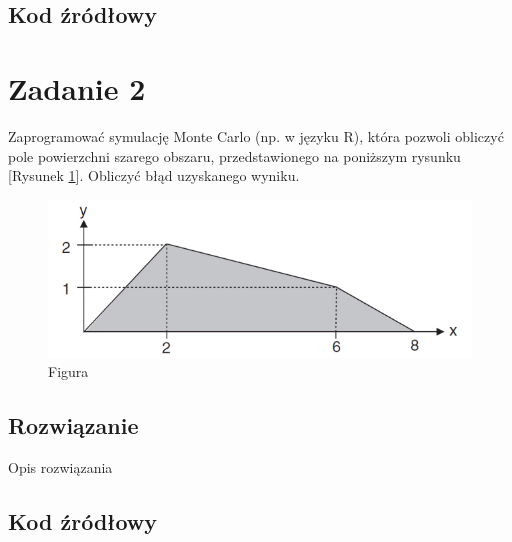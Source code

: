 \documentclass[a4paper,11pt,titlepage]{article}
\begin{document}
\subsection{Kod źródłowy}




\section{Zadanie 2}
Zaprogramować symulację Monte Carlo (np. w języku R), która pozwoli obliczyć pole powierzchni szarego obszaru, przedstawionego na poniższym rysunku [Rysunek \ref{fig:wykres2}]. Obliczyć błąd uzyskanego wyniku.

\begin{figure}[H]
\centering
\includegraphics[width=1\columnwidth]{img/zad2.PNG}
\caption{Figura}
\label{fig:wykres2}
\end{figure}

\subsection{Rozwiązanie}
Opis rozwiązania

\subsection{Kod źródłowy}

\end{document}
